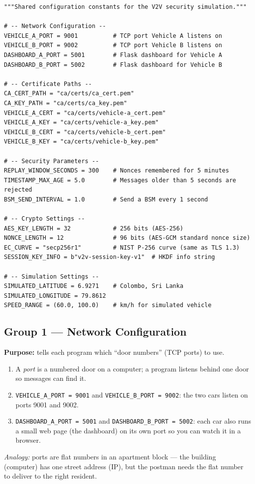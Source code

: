 \documentclass[11pt,a4paper]{report}
\begin{document}
\begin{lstlisting}[style=py,caption={config.py --- shared constants for the
whole simulation (decorative dashes in the original comments shortened to
plain ASCII for printing).}]
"""Shared configuration constants for the V2V security simulation."""

# -- Network Configuration --
VEHICLE_A_PORT = 9001          # TCP port Vehicle A listens on
VEHICLE_B_PORT = 9002          # TCP port Vehicle B listens on
DASHBOARD_A_PORT = 5001        # Flask dashboard for Vehicle A
DASHBOARD_B_PORT = 5002        # Flask dashboard for Vehicle B

# -- Certificate Paths --
CA_CERT_PATH = "ca/certs/ca_cert.pem"
CA_KEY_PATH = "ca/certs/ca_key.pem"
VEHICLE_A_CERT = "ca/certs/vehicle-a_cert.pem"
VEHICLE_A_KEY = "ca/certs/vehicle-a_key.pem"
VEHICLE_B_CERT = "ca/certs/vehicle-b_cert.pem"
VEHICLE_B_KEY = "ca/certs/vehicle-b_key.pem"

# -- Security Parameters --
REPLAY_WINDOW_SECONDS = 300    # Nonces remembered for 5 minutes
TIMESTAMP_MAX_AGE = 5.0        # Messages older than 5 seconds are rejected
BSM_SEND_INTERVAL = 1.0        # Send a BSM every 1 second

# -- Crypto Settings --
AES_KEY_LENGTH = 32            # 256 bits (AES-256)
NONCE_LENGTH = 12              # 96 bits (AES-GCM standard nonce size)
EC_CURVE = "secp256r1"         # NIST P-256 curve (same as TLS 1.3)
SESSION_KEY_INFO = b"v2v-session-key-v1"  # HKDF info string

# -- Simulation Settings --
SIMULATED_LATITUDE = 6.9271    # Colombo, Sri Lanka
SIMULATED_LONGITUDE = 79.8612
SPEED_RANGE = (60.0, 100.0)    # km/h for simulated vehicle
\end{lstlisting}

\subsection{Group 1 --- Network Configuration}
\textbf{Purpose:} tells each program which ``door numbers'' (TCP ports) to use.
\begin{enumerate}
  \item A \emph{port} is a numbered door on a computer; a program listens behind
        one door so messages can find it.
  \item \texttt{VEHICLE\_A\_PORT = 9001} and \texttt{VEHICLE\_B\_PORT = 9002}:
        the two cars listen on ports 9001 and 9002.
  \item \texttt{DASHBOARD\_A\_PORT = 5001} and \texttt{DASHBOARD\_B\_PORT = 5002}:
        each car also runs a small web page (the dashboard) on its own port so
        you can watch it in a browser.
\end{enumerate}
\emph{Analogy:} ports are flat numbers in an apartment block --- the building
(computer) has one street address (IP), but the postman needs the flat number
to deliver to the right resident.
\end{document}
